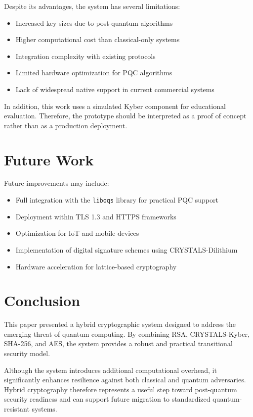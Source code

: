 \documentclass[12pt,a4paper]{article}
\begin{document}
Despite its advantages, the system has several limitations:
\begin{itemize}[leftmargin=2em]
    \item Increased key sizes due to post-quantum algorithms
    \item Higher computational cost than classical-only systems
    \item Integration complexity with existing protocols
    \item Limited hardware optimization for PQC algorithms
    \item Lack of widespread native support in current commercial systems
\end{itemize}

In addition, this work uses a simulated Kyber component for educational evaluation. Therefore, the prototype should be interpreted as a proof of concept rather than as a production deployment.

\section{Future Work}

Future improvements may include:
\begin{itemize}[leftmargin=2em]
    \item Full integration with the \texttt{liboqs} library for practical PQC support
    \item Deployment within TLS 1.3 and HTTPS frameworks
    \item Optimization for IoT and mobile devices
    \item Implementation of digital signature schemes using CRYSTALS-Dilithium
    \item Hardware acceleration for lattice-based cryptography
\end{itemize}

\section{Conclusion}

This paper presented a hybrid cryptographic system designed to address the emerging threat of quantum computing. By combining RSA, CRYSTALS-Kyber, SHA-256, and AES, the system provides a robust and practical transitional security model.

Although the system introduces additional computational overhead, it significantly enhances resilience against both classical and quantum adversaries. Hybrid cryptography therefore represents a useful step toward post-quantum security readiness and can support future migration to standardized quantum-resistant systems.
\end{document}
